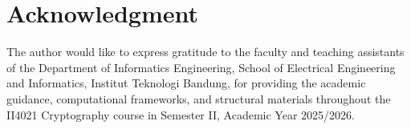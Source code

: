 \section*{Acknowledgment}

The author would like to express gratitude to the faculty and teaching assistants of the Department of Informatics Engineering, School of Electrical Engineering and Informatics, Institut Teknologi Bandung, for providing the academic guidance, computational frameworks, and structural materials throughout the II4021 Cryptography course in Semester II, Academic Year 2025/2026.
